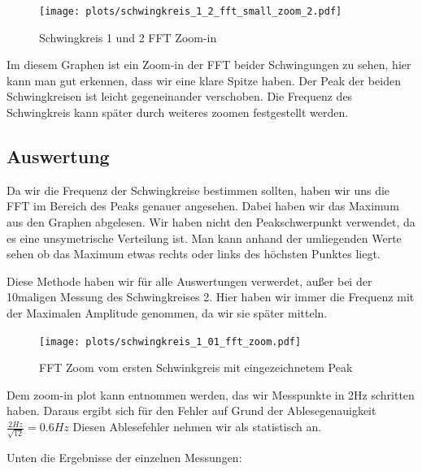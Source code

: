 \documentclass[twoside]{protokoll}
\begin{document}
\begin{figure}[H]
    \centering
    \texttt{[image: plots/schwingkreis\_1\_2\_fft\_small\_zoom\_2.pdf]}
    \caption{Schwingkreis 1 und 2 FFT Zoom-in}
\end{figure}

Im diesem Graphen ist ein Zoom-in der FFT beider Schwingungen zu sehen, hier kann man gut erkennen, dass wir eine klare Spitze haben. Der Peak der beiden Schwingkreisen ist leicht gegeneinander verschoben.
Die Frequenz des Schwingkreis kann später durch weiteres zoomen festgestellt werden.


\subsection{Auswertung}
Da wir die Frequenz der Schwingkreise bestimmen sollten, haben wir uns die FFT im Bereich des Peaks genauer angesehen.
Dabei haben wir das Maximum aus den Graphen abgelesen. Wir haben nicht den Peakschwerpunkt verwendet, da es eine unsymetrische Verteilung ist.
Man kann anhand der umliegenden Werte sehen ob das Maximum etwas rechts oder links des höchsten Punktes liegt.

Diese Methode haben wir für alle Auswertungen verwerdet, außer bei der 10maligen Messung des Schwingkreises 2.
Hier haben wir immer die Frequenz mit der Maximalen Amplitude genommen, da wir sie später mitteln.

\begin{figure}[H]
    \centering
    \texttt{[image: plots/schwingkreis\_1\_01\_fft\_zoom.pdf]}
    \caption{FFT Zoom vom ersten Schwinkgreis mit eingezeichnetem Peak}
    \label{fig:peak}
\end{figure}
Dem zoom-in plot kann entnommen werden, das wir Messpunkte in 2Hz schritten haben.
Daraus ergibt sich für den Fehler auf Grund der Ablesegenauigkeit $ \frac{2Hz}{\sqrt{12}} = 0.6Hz $ 
 Diesen Ablesefehler nehmen wir als statistisch an.


Unten die Ergebnisse der einzelnen Messungen:
\end{document}
